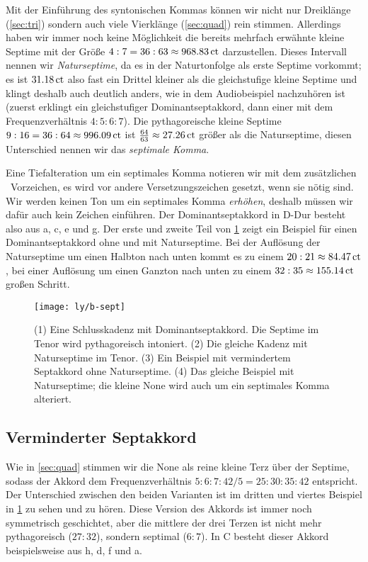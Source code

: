 \documentclass[ngerman,11pt]{scrartcl}
\begin{document}
Mit der Einführung des syntonischen Kommas können wir nicht nur Dreiklänge
(\cref{sec:tri}) sondern auch viele Vierklänge (\cref{sec:quad}) rein stimmen.
Allerdings haben wir immer noch keine Möglichkeit die bereits mehrfach erwähnte
kleine Septime mit der Größe $4:7=36:63\approx 968.83\,\mathrm{ct}$ darzustellen.
Dieses Intervall nennen wir \emph{Naturseptime}, da es in der Naturtonfolge als
erste Septime vorkommt; es ist $31.18\,\mathrm{ct}$ also fast ein Drittel 
kleiner als die gleichstufige kleine Septime und klingt deshalb auch deutlich
anders, wie in dem Audiobeispiel nachzuhören ist (zuerst erklingt
ein gleichstufiger Dominantseptakkord, dann einer mit dem Frequenzverhältnis
$4:5:6:7$). Die pythagoreische kleine Septime
$9:16=36:64\approx 996.09\,\mathrm{ct}$ ist $\frac{64}{63}\approx 27.26\,\mathrm{ct}$
größer als die Naturseptime, diesen Unterschied nennen wir das
\emph{septimale Komma}.

Eine Tiefalteration um ein septimales Komma notieren wir mit dem zusätzlichen
\septimal\ Vorzeichen, es wird vor andere Versetzungszeichen gesetzt, wenn sie
nötig sind. Wir werden keinen Ton um ein septimales Komma \emph{erhöhen},
deshalb müssen wir dafür auch kein Zeichen einführen. Der Dominantseptakkord in
D-Dur besteht also aus a, \sharpm c, e und \septimal g. Der erste und zweite
Teil von \cref{fig:sept} zeigt ein Beispiel für einen Dominantseptakkord ohne
und mit Naturseptime. Bei der Auflösung der Naturseptime um einen Halbton nach
unten kommt es zu einem $20:21\approx 84.47\,\mathrm{ct}$, bei einer Auflösung um
einen Ganzton nach unten zu einem $32:35\approx 155.14\,\mathrm{ct}$ großen Schritt.

\begin{figure}
	\centering
	\texttt{[image: ly/b-sept]}
	\caption{(1) Eine Schlusskadenz mit Dominantseptakkord. Die Septime im
		Tenor wird pythagoreisch intoniert.
		\quad(2) Die gleiche Kadenz mit Naturseptime im Tenor.
		\quad(3) Ein Beispiel mit vermindertem Septakkord ohne Naturseptime.
		\quad(4) Das gleiche Beispiel mit Naturseptime; die kleine None wird
		auch um ein septimales Komma alteriert.}\label{fig:sept}
\end{figure}

\subsection{Verminderter Septakkord}

Wie in \cref{sec:quad} stimmen wir die None als reine kleine Terz über der
Septime, sodass der Akkord dem Frequenzverhältnis $5:6:7:42/5 = 25:30:35:42$
entspricht. Der Unterschied zwischen den beiden Varianten ist im dritten und
viertes Beispiel in \cref{fig:sept} zu sehen und zu hören. Diese Version des
Akkords ist immer noch symmetrisch geschichtet, aber die mittlere der drei
Terzen ist nicht mehr pythagoreisch ($27:32$), sondern septimal ($6:7$). In C besteht dieser Akkord beispielsweise aus \naturalm h, d, \septimal f und \septimal \flatp a.
\end{document}
